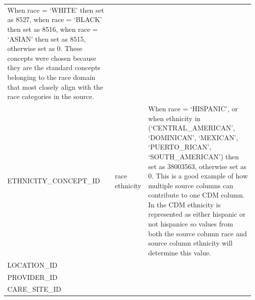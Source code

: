 \documentclass[11pt]{book}
\theoremstyle{definition}
\theoremstyle{definition}
\theoremstyle{definition}
\theoremstyle{remark}
\begin{document}
\begin{longtable}[]{@{}lll@{}}
\begin{minipage}[t]{0.51\columnwidth}
When race = `WHITE' then set as 8527, when race = `BLACK' then set as 8516, when race = `ASIAN' then set as 8515, otherwise set as 0. These concepts were chosen because they are the standard concepts belonging to the race domain that most closely align with the race categories in the source.\strut
\end{minipage}\tabularnewline
\begin{minipage}[t]{0.28\columnwidth}\raggedright
ETHNICITY\_CONCEPT\_ID\strut
\end{minipage} & \begin{minipage}[t]{0.12\columnwidth}\raggedright
race ethnicity\strut
\end{minipage} & \begin{minipage}[t]{0.51\columnwidth}\raggedright
When race = `HISPANIC', or when ethnicity in (`CENTRAL\_AMERICAN', `DOMINICAN', `MEXICAN', `PUERTO\_RICAN', `SOUTH\_AMERICAN') then set as 38003563, otherwise set as 0. This is a good example of how multiple source columns can contribute to one CDM column. In the CDM ethnicity is represented as either hispanic or not hispanice so values from both the source column race and source column ethnicity will determine this value.\strut
\end{minipage}\tabularnewline
\begin{minipage}[t]{0.28\columnwidth}\raggedright
LOCATION\_ID\strut
\end{minipage} & \begin{minipage}[t]{0.12\columnwidth}\raggedright
\strut
\end{minipage} & \begin{minipage}[t]{0.51\columnwidth}\raggedright
\strut
\end{minipage}\tabularnewline
\begin{minipage}[t]{0.28\columnwidth}\raggedright
PROVIDER\_ID\strut
\end{minipage} & \begin{minipage}[t]{0.12\columnwidth}\raggedright
\strut
\end{minipage} & \begin{minipage}[t]{0.51\columnwidth}\raggedright
\strut
\end{minipage}\tabularnewline
\begin{minipage}[t]{0.28\columnwidth}\raggedright
CARE\_SITE\_ID\strut
\end{minipage} & \begin{minipage}[t]{0.12\columnwidth}\raggedright
\strut
\end{minipage} & \begin{minipage}[t]{0.51\columnwidth}\raggedright

\end{minipage}
\end{longtable}
\end{document}
